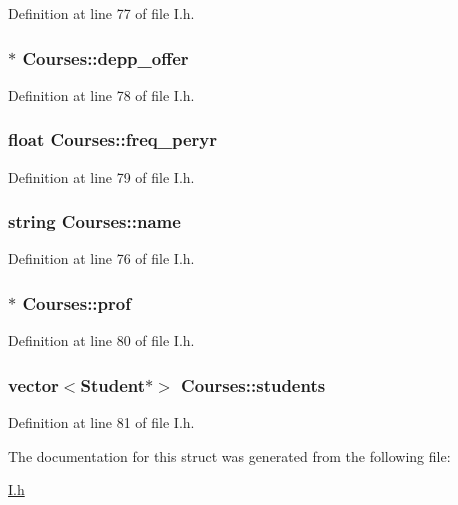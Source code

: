 \-Definition at line 77 of file \-I.\-h.

\hypertarget{structCourses_a1e79f4ee9b386448f55ff67c3774b2e7}{
\subsubsection[{depp\-\_\-offer}]{$\ast$ {\bf \-Courses\-::depp\-\_\-offer}}}\label{structCourses_a1e79f4ee9b386448f55ff67c3774b2e7}


\-Definition at line 78 of file \-I.\-h.

\hypertarget{structCourses_ac26eececbf8ac75d49141c8c45f82d00}{
\subsubsection[{freq\-\_\-peryr}]{\setlength{\rightskip}{0pt plus 5cm}float {\bf \-Courses\-::freq\-\_\-peryr}}}\label{structCourses_ac26eececbf8ac75d49141c8c45f82d00}


\-Definition at line 79 of file \-I.\-h.

\hypertarget{structCourses_a1b69b3e3946474f0a8950647bb2277fe}{
\subsubsection[{name}]{\setlength{\rightskip}{0pt plus 5cm}string {\bf \-Courses\-::name}}}\label{structCourses_a1b69b3e3946474f0a8950647bb2277fe}


\-Definition at line 76 of file \-I.\-h.

\hypertarget{structCourses_a66b7da160aaf398d019a44070203ac74}{
\subsubsection[{prof}]{$\ast$ {\bf \-Courses\-::prof}}}\label{structCourses_a66b7da160aaf398d019a44070203ac74}


\-Definition at line 80 of file \-I.\-h.

\hypertarget{structCourses_a623778fdddd17fc0ebdee5ef76ce6020}{
\subsubsection[{students}]{\setlength{\rightskip}{0pt plus 5cm}vector$<${\bf \-Student}$\ast$$>$ {\bf \-Courses\-::students}}}\label{structCourses_a623778fdddd17fc0ebdee5ef76ce6020}


\-Definition at line 81 of file \-I.\-h.



\-The documentation for this struct was generated from the following file\-:\begin{DoxyCompactItemize}
\item 
\hyperlink{I_8h}{\-I.\-h}\end{DoxyCompactItemize}
